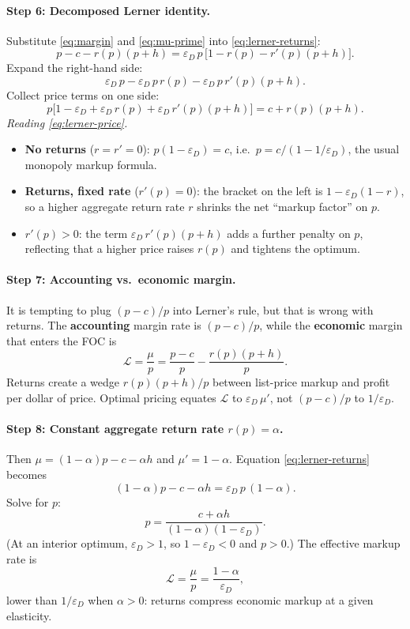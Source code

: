 \documentclass[11pt]{article}
\begin{document}
\paragraph{Step 6: Decomposed Lerner identity.}
Substitute \eqref{eq:margin} and \eqref{eq:mu-prime} into
\eqref{eq:lerner-returns}:
\begin{equation}
  p - c - r(p)(p+h)
  = \varepsilon_D\, p\,\bigl[1 - r(p) - r'(p)(p+h)\bigr].
  \label{eq:lerner-expanded}
\end{equation}
Expand the right-hand side:
\[
  \varepsilon_D\, p - \varepsilon_D\, p\, r(p)
  - \varepsilon_D\, p\, r'(p)(p+h).
\]
Collect price terms on one side:
\begin{equation}
  p\bigl[1 - \varepsilon_D + \varepsilon_D\, r(p) + \varepsilon_D\, r'(p)(p+h)\bigr]
  = c + r(p)(p+h).
  \label{eq:lerner-price}
\end{equation}
\emph{Reading \eqref{eq:lerner-price}.}
\begin{itemize}
  \item \textbf{No returns} ($r=r'=0$): $p(1-\varepsilon_D)=c$, i.e.\
    $p = c/(1-1/\varepsilon_D)$, the usual monopoly markup formula.
  \item \textbf{Returns, fixed rate} ($r'(p)=0$): the bracket on the left is
    $1 - \varepsilon_D(1-r)$, so a higher aggregate return rate $r$ shrinks
    the net ``markup factor'' on $p$.
  \item \textbf{$r'(p)>0$}: the term $\varepsilon_D\, r'(p)(p+h)$ adds a
    further penalty on $p$, reflecting that a higher price raises $r(p)$ and
    tightens the optimum.
\end{itemize}

\paragraph{Step 7: Accounting vs.\ economic margin.}
It is tempting to plug $(p-c)/p$ into Lerner's rule, but that is wrong with
returns.  The \textbf{accounting} margin rate is $(p-c)/p$, while the
\textbf{economic} margin that enters the FOC is
\[
  \mathcal{L} = \frac{\mu}{p}
  = \frac{p-c}{p} - \frac{r(p)(p+h)}{p}.
\]
Returns create a wedge $r(p)(p+h)/p$ between list-price markup and profit
per dollar of price.  Optimal pricing equates $\mathcal{L}$ to
$\varepsilon_D\,\mu'$, not $(p-c)/p$ to $1/\varepsilon_D$.

\paragraph{Step 8: Constant aggregate return rate $r(p)=\alpha$.}
Then $\mu = (1-\alpha)p - c - \alpha h$ and $\mu' = 1-\alpha$.  Equation
\eqref{eq:lerner-returns} becomes
\[
  (1-\alpha)p - c - \alpha h = \varepsilon_D\, p\,(1-\alpha).
\]
Solve for $p$:
\begin{equation}
  p
  = \frac{c + \alpha h}{(1-\alpha)(1-\varepsilon_D)}.
  \label{eq:p-star-constant-r}
\end{equation}
(At an interior optimum, $\varepsilon_D>1$, so $1-\varepsilon_D<0$ and
$p>0$.)  The effective markup rate is
\[
  \mathcal{L} = \frac{\mu}{p} = \frac{1-\alpha}{\varepsilon_D},
\]
lower than $1/\varepsilon_D$ when $\alpha>0$: returns compress economic
markup at a given elasticity.
\end{document}
